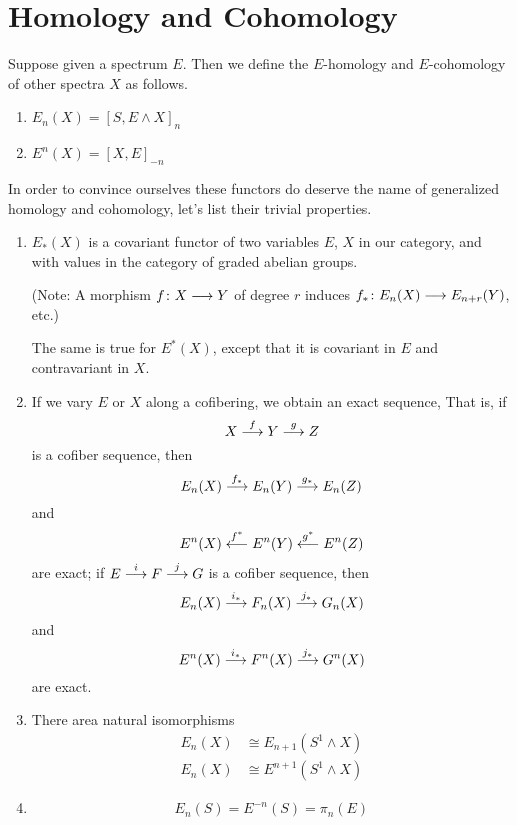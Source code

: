 \documentclass[../main]{subfiles}
\begin{document}
\label{sec:p3c06}
\chapter{Homology and Cohomology}


Suppose given a spectrum $E$. Then we define the $E$-homology and $E$-cohomology of other spectra $X$ as follows.
\begin{enumerate}
    \item $E_n(X) = [S, E \wedge X]_n$
    \item $E^n(X) = [X, E]_{-n}$
\end{enumerate}
In order to convince ourselves these functors do deserve the name of generalized homology and cohomology, let's list their trivial properties.
\begin{proposition}\label{prop:p3c06.1}
\begin{enumerate}
    \item $E_\ast(X)$ is a covariant functor of two variables $E$, $X$ in our category, and with values in the category of graded abelian groups.
    
    (Note: A morphism $f\colon X \longrightarrow Y$ of degree $r$ induces $f_\ast\colon E_n(X)\longrightarrow E_{n+r}(Y)$, etc.)
    
    The same is true for $E^\ast(X)$, except that it is covariant in $E$ and contravariant in $X$. 
    \item If we vary $E$ or $X$ along a cofibering, we obtain an exact sequence, That is, if
    \[X \overset{f}{\longrightarrow} Y \overset{g}{\longrightarrow} Z\]
    is a cofiber sequence, then
    \[E_n(X) \overset{f_\ast}{\longrightarrow} E_n(Y) \overset{g_\ast}{\longrightarrow}E_n(Z)\]
    and
    \[E^n(X) \overset{f^\ast}{\longleftarrow} E^n(Y) \overset{g^\ast}{\longleftarrow} E^n(Z)\]
    are exact; if $E \overset{i}{\longrightarrow} F \overset{j}{\longrightarrow} G$ is a cofiber sequence, then
    \[E_n(X) \overset{i_\ast}{\longrightarrow} F_n(X) \overset{j_\ast}{\longrightarrow} G_n(X)\]
    and
    \[E^n(X) \overset{i_\ast}{\longrightarrow} F^n(X) \overset{j_\ast}{\longrightarrow} G^n(X)\]
    are exact.
    \item There area natural isomorphisms
    \begin{align}
        E_n(X) &\cong E_{n+1}(S^1 \wedge X) \nonumber \\
        E_n(X) &\cong E^{n+1}(S^1 \wedge X)\nonumber
    \end{align}
    \item
    \begin{align}
        E_n(S)=E^{-n}(S)=\pi_n(E) \nonumber
    \end{align}
\end{enumerate}
\end{proposition}
\end{document}
